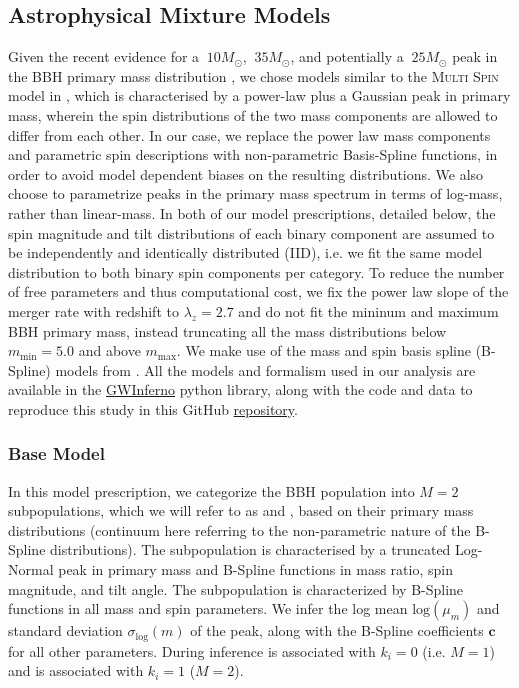 \subsection{Astrophysical Mixture Models} \label{sec:astromodels} 

Given the recent evidence for a $~10 M_{\odot}$, $~35 M_{\odot}$, and potentially a $~25 M_{\odot}$ peak in the BBH primary mass distribution \citep{2111.03634, 2022ApJ...928..155T, 10.3847/2041-8213/aa9bf6, 10.3847/1538-4357/aab34c, 10.3847/2041-8213/ab3800, 2021ApJ...913L...7A}, we chose models similar to the \textsc{Multi Spin} model in \cite{2021ApJ...913L...7A}, which is characterised by a power-law plus a Gaussian peak in primary mass, wherein the spin distributions of the two mass components are allowed to differ from each other. In our case, we replace the power law mass components and parametric spin descriptions with non-parametric Basis-Spline functions, in order to avoid model dependent biases on the resulting distributions.
We also choose to parametrize peaks in the primary mass spectrum in terms of log-mass, rather than linear-mass. 
In both of our model prescriptions, detailed below, the spin magnitude and tilt distributions of each binary component are assumed to be independently and identically distributed (IID), i.e. we fit the same model distribution to both binary spin components per category. To reduce the number of free parameters and thus computational cost, we fix the power law slope of the merger rate with redshift to $\lambda_z=2.7$ and do not fit the mininum and maximum BBH primary mass, instead truncating all the mass distributions below $m_\text{min} = 5.0$ and above $m_\text{max}$. We make use of the mass and spin basis spline (B-Spline) models from \cite{2022arXiv221012834E}. All the models and formalism used in our analysis are available in the \href{https://git.ligo.org/bruce.edelman/gwinferno}{GWInferno} python library, along with the code and data to reproduce this study in this GitHub \href{https://github.com/jaxeng/paper}{repository}. 



\subsubsection{Base Model}
In this model prescription, we categorize the BBH population into $M=2$ subpopulations, which we will refer to as \first{} and \contB{}, based on their primary mass distributions (continuum here referring to the non-parametric nature of the B-Spline distributions). The \first{} subpopulation is characterised by a truncated Log-Normal peak in primary mass and B-Spline functions in mass ratio, spin magnitude, and tilt angle. The \contB{} subpopulation is characterized by B-Spline functions in all mass and spin parameters. We infer the log mean $\text{log}(\mu_m)$ and standard deviation $\sigma_\text{log}(m)$ of the peak, along with the B-Spline coefficients $\mathbf{c}$ for all other parameters. During inference \first{} is associated with $k_i = 0$ (i.e. $M=1$) and \contB{} is associated with $k_i = 1$ ($M=2$).

